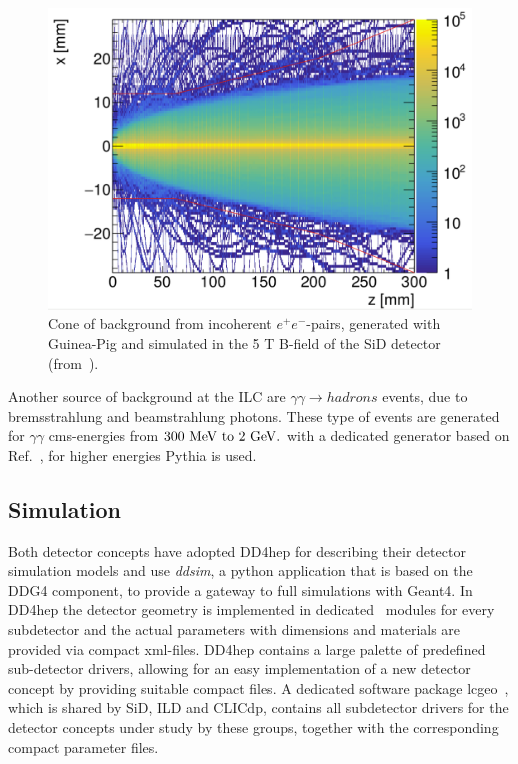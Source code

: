 \begin{figure}
\begin{center}
\includegraphics[width=0.90\hsize]{chapters/figures/pair_bg_cone_SiD.png}
\end{center}
\caption{Cone of background from incoherent $e^+e^-$-pairs, generated with Guinea-Pig and simulated in the 5 T B-field of the SiD
  detector (from~\cite{Schutz:2017ihd}).}
\label{fig:pair_bg}
\end{figure}

Another source of background at the ILC are $\gamma \gamma \rightarrow hadrons$ events, due to bremsstrahlung and beamstrahlung photons.
These type of events are generated for $\gamma \gamma$ cms-energies from $300~\rm{MeV~to} ~2~\rm{GeV}.$ with a dedicated generator based
on Ref.~\cite{Chen:1993dba}, for higher energies Pythia is used.


\subsection{\label{sub:sw-sim}Simulation}

Both detector concepts have adopted DD4hep for describing their detector simulation models and use \emph{ddsim}, a python application that
is based on the DDG4 component, to provide a gateway to full simulations with Geant4.
In DD4hep the detector geometry is implemented in dedicated \CPP\  modules for every subdetector and the actual parameters with dimensions
and materials are provided via compact xml-files. DD4hep contains a
 large palette of predefined sub-detector drivers, allowing for an
easy implementation of a new detector concept by providing suitable compact files.
A dedicated software package lcgeo~\cite{bib:lcgeo}, which is shared by SiD, ILD and CLICdp, contains all subdetector drivers for the
detector concepts under study by these groups, together with the corresponding compact parameter files.

